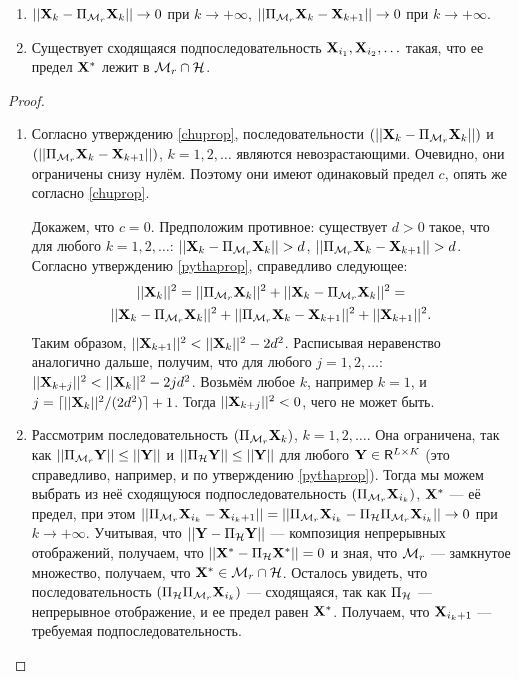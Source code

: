 \documentclass[12pt,a4paper,fleqn,leqno]{article}
\begin{document}
\begin{theorem}
\begin{enumerate}
\item $||\mathbf{X}_k - \Pi_{\mathcal{M}_r}\mathbf{X}_k|| \to 0$ при $k \to +\infty$, $||\Pi_{\mathcal{M}_r}\mathbf{X}_k - \mathbf{X}_{k+1}|| \to 0$ при $k \to +\infty$.
\item Существует сходящаяся подпоследовательность $\mathbf{X}_{i_1}, \mathbf{X}_{i_2}, \ldots$ такая, что ее предел $\mathbf{X}^*$ лежит в $\mathcal{M}_r \cap \mathcal{H}$.
\end{enumerate}
\begin{proof}
\begin{enumerate}
\item Согласно утверждению \ref{chuprop}, последовательности $(||\mathbf{X}_k - \Pi_{\mathcal{M}_r} \mathbf{X}_k||)$ и $(||\Pi_{\mathcal{M}_r} \mathbf{X}_k - \mathbf{X}_{k + 1}||)$, $k = 1, 2, \ldots$ являются невозрастающими. Очевидно, они ограничены снизу нулём. Поэтому они имеют одинаковый предел $c$, опять же согласно \ref{chuprop}.

Докажем, что $c = 0$. Предположим противное: существует $d > 0$ такое, что для любого $k = 1, 2, \ldots$: $||\mathbf{X}_k - \Pi_{\mathcal{M}_r} \mathbf{X}_k|| > d$, $||\Pi_{\mathcal{M}_r} \mathbf{X}_k - \mathbf{X}_{k + 1}|| > d$. Согласно утверждению \ref{pythaprop}, справедливо следующее:
\begin{gather*}
||\mathbf{X}_k||^2 = ||\Pi_{\mathcal{M}_r} \mathbf{X}_k||^2 + ||\mathbf{X}_k - \Pi_{\mathcal{M}_r} \mathbf{X}_k||^2 =\\ ||\mathbf{X}_k - \Pi_{\mathcal{M}_r} \mathbf{X}_k||^2 + ||\Pi_{\mathcal{M}_r} \mathbf{X}_k - \mathbf{X}_{k + 1}||^2 + ||\mathbf{X}_{k + 1}||^2.
\end{gather*}
Таким образом, $||\mathbf{X}_{k+1}||^2 < ||\mathbf{X}_k||^2 - 2d^2$. Расписывая неравенство аналогично дальше, получим, что для любого $j = 1, 2, \ldots$: $||\mathbf{X}_{k+j}||^2 < ||\mathbf{X}_k||^2 - 2 j d^2$. Возьмём любое $k$, например $k = 1$, и $j = \lceil ||\mathbf{X}_k||^2 / (2d^2) \rceil + 1$. Тогда $||\mathbf{X}_{k+j}||^2 < 0$, чего не может быть.
\item Рассмотрим последовательность $(\Pi_{\mathcal{M}_r} \mathbf{X}_k)$, $k = 1, 2, \ldots$. Она ограничена, так как $||\Pi_{\mathcal{M}_r} \mathbf{Y}|| \le ||\mathbf{Y}||$ и $||\Pi_{\mathcal{H}} \mathbf{Y}|| \le ||\mathbf{Y}||$ для любого $\mathbf{Y} \in \mathsf{R}^{L \times K}$ (это справедливо, например, и по утверждению \ref{pythaprop}). Тогда мы можем выбрать из неё сходящуюся подпоследовательность $(\Pi_{\mathcal{M}_r} \mathbf{X}_{i_k})$, $\mathbf{X}^*$ --- её предел, при этом $||\Pi_{\mathcal{M}_r} \mathbf{X}_{i_k} - \mathbf{X}_{i_k + 1}|| = ||\Pi_{\mathcal{M}_r} \mathbf{X}_{i_k} - \Pi_{\mathcal{H}} \Pi_{\mathcal{M}_r} \mathbf{X}_{i_k}|| \to 0$ при $k \to + \infty$. Учитывая, что $||\mathbf{Y} - \Pi_{\mathcal{H}} \mathbf{Y}||$ --- композиция непрерывных отображений, получаем, что $||\mathbf{X}^* - \Pi_{\mathcal{H}} \mathbf{X}^*|| = 0$ и зная, что $\mathcal{M}_r$ --- замкнутое множество, получаем, что $\mathbf{X}^* \in \mathcal{M}_r \cap \mathcal{H}$. Осталось увидеть, что последовательность $(\Pi_{\mathcal{H}} \Pi_{\mathcal{M}_r} \mathbf{X}_{i_k})$ --- сходящаяся, так как $\Pi_{\mathcal{H}}$ --- непрерывное отображение, и ее предел равен $\mathbf{X}^*$. Получаем, что $\mathbf{X}_{i_k + 1}$ --- требуемая подпоследовательность.
\end{enumerate}
\end{proof}
\end{theorem}
\end{document}
